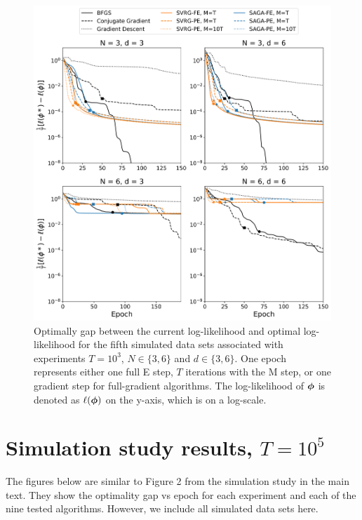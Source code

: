 \documentclass[12pt]{article}
\begin{document}
\begin{figure}[H]
    \centering
    \includegraphics[width=6.5in]{../plt/log-like_v_epoch_T-1000-004.png}
    \caption{Optimally gap between the current log-likelihood and optimal log-likelihood for the fifth simulated data sets associated with experiments $T=10^{3}$, $N \in \{3,6\}$ and $d \in \{3,6\}$. One epoch represents either one full E step, $T$ iterations with the M step, or one gradient step for full-gradient algorithms. The log-likelihood of $\boldsymbol{\phi}$ is denoted as $\ell(\boldsymbol{\phi})$ on the y-axis, which is on a log-scale.}
\end{figure}

\newpage

\section{Simulation study results, $T = 10^{5}$}

The figures below are similar to Figure 2 from the simulation study in the main text. They show the optimality gap vs epoch for each experiment and each of the nine tested algorithms. However, we include all simulated data sets here.
\end{document}
